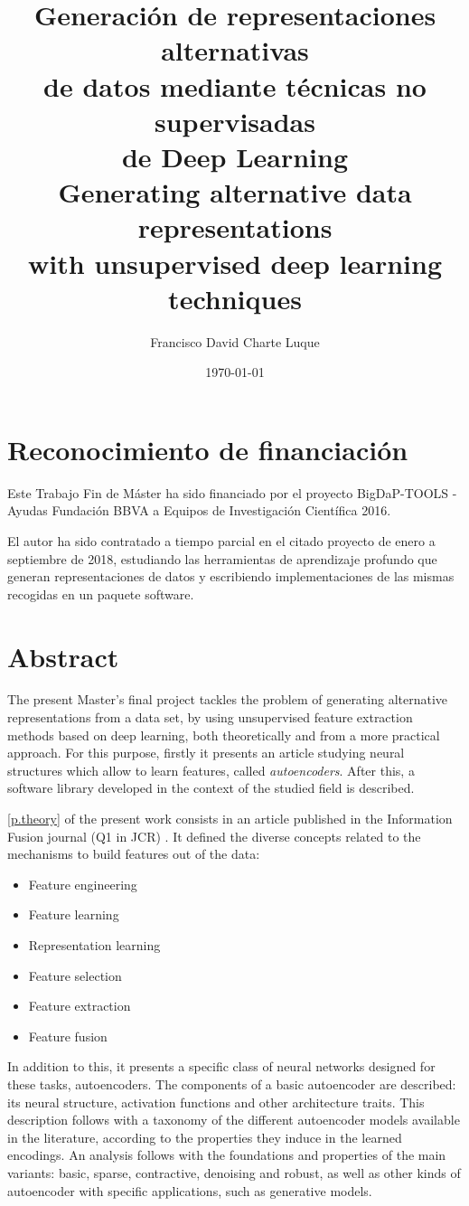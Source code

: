 \documentclass[oneside,openright,titlepage,numbers=noenddot,openany,headinclude,footinclude=true,
cleardoublepage=empty,abstractoff,BCOR=5mm,paper=a4,fontsize=12pt,main=spanish]{scrreprt}
\author{Francisco David Charte Luque}
\date{\today}
\title{Generación de representaciones alternativas\\de datos mediante técnicas no supervisadas\\de Deep Learning\\\vspace{1em}Generating alternative data representations\\with unsupervised deep learning techniques}
\DeclareRobustCommand{\chaptertitle}[1]{\textls[80]{\scshape #1}}
\begin{document}
\maketitle
\tableofcontents

\clearpage

\chapter*{Reconocimiento de financiación}
Este Trabajo Fin de Máster ha sido financiado por el proyecto BigDaP-TOOLS - Ayudas Fundación BBVA a Equipos de Investigación Científica 2016. 

El autor ha sido contratado a tiempo parcial en el citado proyecto de enero a septiembre de 2018, estudiando las herramientas de aprendizaje profundo que generan representaciones de datos y escribiendo implementaciones de las mismas recogidas en un paquete software.
\clearpage

\chapter*{Abstract}
\addcontentsline{toc}{chapter}{\chaptertitle{abstract}}

The present Master's final project tackles the problem of generating alternative representations from a data set, by using unsupervised feature extraction methods based on deep learning, both theoretically and from a more practical approach. For this purpose, firstly it presents an article studying neural structures which allow to learn features, called \textit{autoencoders}.  After this, a software library developed in the context of the studied field is described.

\autoref{p.theory} of the present work consists in an article published in the Information Fusion journal (Q1 in JCR) \cite{charte2017}. It defined the diverse concepts related to the mechanisms to build features out of the data:
\begin{itemize}
\item Feature engineering
\item Feature learning
\item Representation learning
\item Feature selection
\item Feature extraction
\item Feature fusion
\end{itemize}

In addition to this, it presents a specific class of neural networks designed for these tasks, autoencoders. The components of a basic autoencoder are described: its neural structure, activation functions and other architecture traits. This description follows with a taxonomy of the different autoencoder models available in the literature, according to the properties they induce in the learned encodings. An analysis follows with the foundations and properties of the main variants: basic, sparse, contractive, denoising and robust, as well as other kinds of autoencoder with specific applications, such as generative models.
\end{document}
